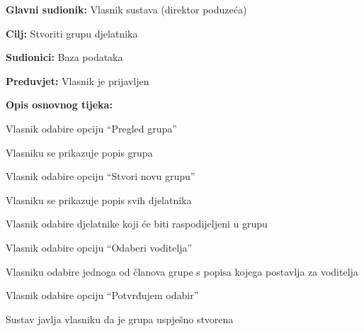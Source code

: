 			\noindent {}
			\begin{packed_item}
			
			\item \textbf{Glavni sudionik: } Vlasnik sustava (direktor poduzeća)
			\item  \textbf{Cilj:} Stvoriti grupu djelatnika 
			\item  \textbf{Sudionici:} Baza podataka
			\item  \textbf{Preduvjet:} Vlasnik je prijavljen
			\item  \textbf{Opis osnovnog tijeka:}
			\item[] \begin{packed_enum}
				\item Vlasnik odabire opciju “Pregled grupa” 
				\item Vlasniku se prikazuje popis grupa 
				\item Vlasnik odabire opciju “Stvori novu grupu” 
				\item Vlasniku se prikazuje popis svih djelatnika  
				\item Vlasnik odabire djelatnike koji će biti raspodijeljeni u grupu 
				\item Vlasnik odabire opciju “Odaberi voditelja” 
				\item Vlasniku odabire jednoga od članova grupe s popisa kojega postavlja za voditelja 
				\item Vlasnik odabire opciju “Potvrđujem odabir” 
				\item Sustav javlja vlasniku da je grupa uspješno stvorena 
					\end{packed_enum}
			\end{packed_item}
				
